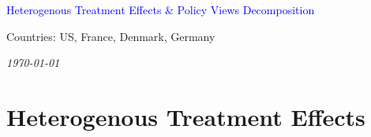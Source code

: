 



%
              





\begin{frame}
\thispagestyle{empty}
\begin{center}
\begin{LARGE}
\textcolor{blue}{Heterogenous Treatment Effects \& Policy Views Decomposition}
\end{LARGE}

\vspace{1cm}

Countries: US, France, Denmark, Germany


\textit{\today} 

\end{center}

\bigskip

\end{frame}

\section{Heterogenous Treatment Effects}

